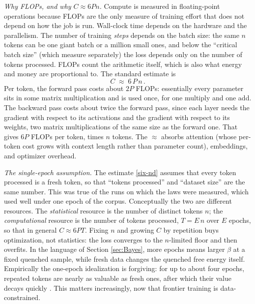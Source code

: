 \documentclass[11pt]{article}
\begin{document}
\emph{Why FLOPs, and why $C \approx 6Pn$.} Compute is measured in floating-point operations because FLOPs are the only measure of training effort that does not depend on how the job is run. Wall-clock time depends on the hardware and the parallelism. The number of training \emph{steps} depends on the batch size: the same $n$ tokens can be one giant batch or a million small ones, and below the ``critical batch size'' (which \cite{kaplan2020scaling} measure separately) the loss depends only on the number of tokens processed. FLOPs count the arithmetic itself, which is also what energy and money are proportional to. The standard estimate is
%
\begin{equation} \label{six-nd}
    C \;\approx\; 6\,P\,n\,.
\end{equation}
%
Per token, the forward pass costs about $2P$ FLOPs: essentially every parameter sits in some matrix multiplication and is used once, for one multiply and one add. The backward pass costs about twice the forward pass, since each layer needs the gradient with respect to its activations and the gradient with respect to its weights, two matrix multiplications of the same size as the forward one. That gives $6P$ FLOPs per token, times $n$ tokens. The $\approx$ absorbs attention (whose per-token cost grows with context length rather than parameter count), embeddings, and optimizer overhead.

\emph{The single-epoch assumption.} The estimate \eqref{six-nd} assumes that every token processed is a fresh token, so that ``tokens processed'' and ``dataset size'' are the same number. This was true of the runs on which the laws were measured, which used well under one epoch of the corpus. Conceptually the two are different resources. The \emph{statistical} resource is the number of distinct tokens $n$; the \emph{computational} resource is the number of tokens processed, $T = E\,n$ over $E$ epochs, so that in general $C\approx 6PT$. Fixing $n$ and growing $C$ by repetition buys optimization, not statistics: the loss converges to the $n$-limited floor and then overfits. In the language of Section \ref{sec:Bayes}, more epochs means larger $\beta$ at a fixed quenched sample, while fresh data changes the quenched free energy itself. Empirically the one-epoch idealization is forgiving: for up to about four epochs, repeated tokens are nearly as valuable as fresh ones, after which their value decays quickly \cite{muennighoff2023scaling}. This matters increasingly, now that frontier training is data-constrained.
\end{document}
